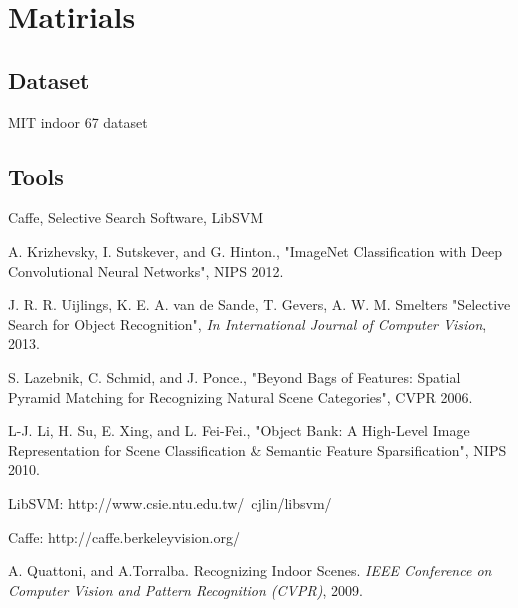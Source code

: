 \documentclass[letterpaper,twocolumn,11pt]{article}
\begin{document}
\section{Matirials}
	\subsection{Dataset}
	MIT indoor 67 dataset\cite{DATA}

	\subsection{Tools}
	Caffe\cite{CAFFE}, Selective Search Software\cite{SS}, LibSVM\cite{SVM}

\begin{thebibliography}{10}

 A. Krizhevsky, I. Sutskever, and G. Hinton.,
"ImageNet Classification with Deep Convolutional Neural Networks",
NIPS 2012.

 J. R. R. Uijlings, K. E. A. van de Sande,
T. Gevers, A. W. M. Smelters
"Selective Search for Object Recognition",
\emph{In International Journal of Computer Vision}, 2013.

 S. Lazebnik, C. Schmid, and J. Ponce.,
"Beyond Bags of Features:
Spatial Pyramid Matching for Recognizing Natural Scene Categories",
CVPR 2006.

 L-J. Li, H. Su, E. Xing, and L. Fei-Fei.,
"Object Bank: A High-Level Image Representation for Scene Classification
\& Semantic Feature Sparsification",
NIPS 2010.

 LibSVM: http://www.csie.ntu.edu.tw/~cjlin/libsvm/

 Caffe: http://caffe.berkeleyvision.org/

 A. Quattoni, and A.Torralba. Recognizing Indoor Scenes.
\emph{IEEE Conference on Computer Vision and Pattern Recognition (CVPR)},
2009.

\end{thebibliography}
\end{document}
